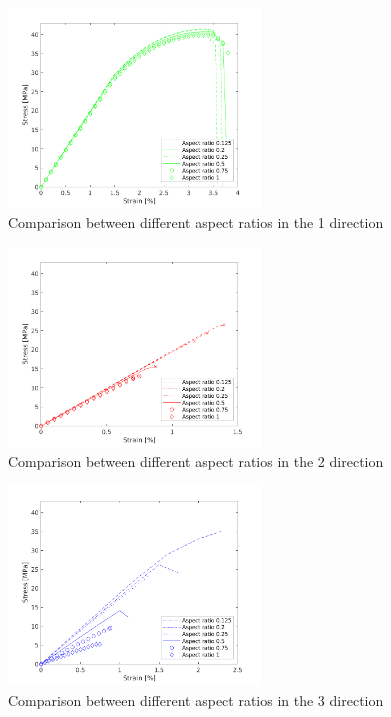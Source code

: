 \begin{figure}[htb]
    \centering
    \includegraphics[width=0.60\textwidth]{chapter_7_non-elasticmodelling/figures/AR1.png}
    \caption{Comparison between different aspect ratios in the 1 direction}
    \label{fig:AR1}
\end{figure}
\begin{figure}[H]
    \centering
    \includegraphics[width=0.60\textwidth]{chapter_7_non-elasticmodelling/figures/AR2.png}
    \caption{Comparison between different aspect ratios in the 2 direction}
    \label{fig:AR2}
\end{figure}
\begin{figure}[H]
    \centering
    \includegraphics[width=0.60\textwidth]{chapter_7_non-elasticmodelling/figures/AR3.png}
    \caption{Comparison between different aspect ratios in the 3 direction}
    \label{fig:AR3}
\end{figure}

